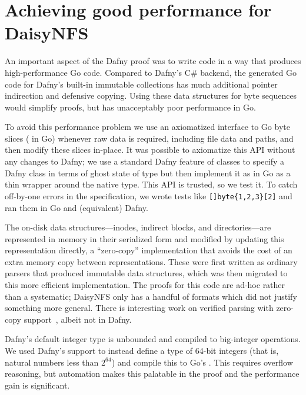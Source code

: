 \section{Achieving good performance for DaisyNFS}
\label{sec:impl:dafny-perf}

An important aspect of the Dafny proof was to write code in a way that produces
high-performance Go code.
Compared to Dafny's C\# backend, the generated Go code for Dafny's built-in
immutable collections has much
additional pointer indirection and defensive copying. Using these data
structures for byte sequences would simplify proofs, but has unacceptably poor
performance in Go.

To avoid this performance problem we use an axiomatized interface to
Go byte slices ( in Go) whenever raw data is required, including file
data and paths, and then modify these slices in-place. It was possible to
axiomatize this API without any changes to Dafny; we use a standard Dafny
feature of  classes to specify a Dafny class  in terms of
ghost state of type  but then implement it as in Go as a thin
wrapper around the native  type. This API is trusted, so we
test it. To catch off-by-one errors in the specification, we wrote
tests like \verb![]byte{1,2,3}[2]! and ran them in Go and
(equivalent) Dafny.

The on-disk data structures---inodes, indirect blocks, and directories---are
represented in memory in their serialized form and modified by updating this
representation directly, a ``zero-copy'' implementation that avoids the cost of
an extra memory copy between representations. These were first written as
ordinary parsers that produced immutable data structures, which was then
migrated to this more efficient implementation. The proofs for this code are
ad-hoc rather than a systematic; DaisyNFS only has a handful of formats which
did not justify something more general. There is interesting work on
verified parsing with zero-copy support~\cite{swamy:everparse3d}, albeit not in Dafny.

Dafny's default integer type  is unbounded and compiled to big-integer
operations. We used Dafny's
 support to instead define a type of 64-bit integers (that
is, natural numbers less than $2^{64}$) and compile this to Go's .
This requires overflow reasoning, but
automation makes this palatable in the proof and the performance gain is
significant.
